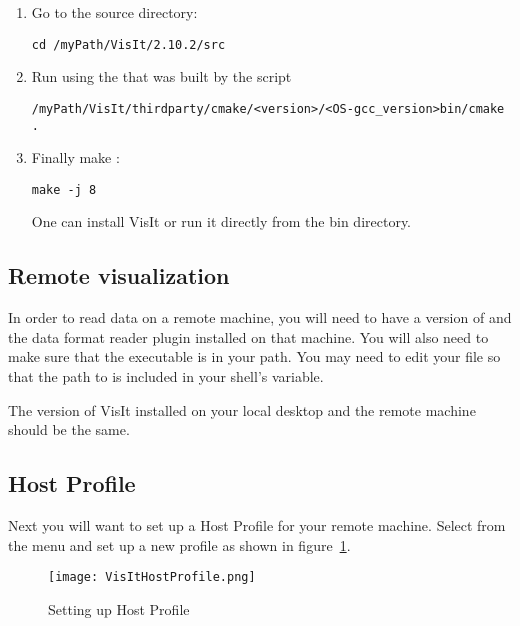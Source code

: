 \documentclass[11pt,fleqn]{book} %
\begin{document}
\begin{enumerate}
  \item Go to the \Visit source directory:
\begin{lstlisting}[backgroundcolor=\color{background}]
cd /myPath/VisIt/2.10.2/src
\end{lstlisting}

  \item Run  using the  that was built by the  script
\begin{lstlisting}[backgroundcolor=\color{background}]
/myPath/VisIt/thirdparty/cmake/<version>/<OS-gcc_version>bin/cmake .
\end{lstlisting}

  \item Finally make \Visit:
\begin{lstlisting}[backgroundcolor=\color{background}]
make -j 8
\end{lstlisting}
        One can install VisIt or run it directly from the bin directory.
\end{enumerate}


\subsection{Remote visualization}
In order to read data on a remote machine, you will need to have a
version of \Visit and the \VTK data format reader plugin installed on that
machine. You will also need to make sure that the \Visit executable is
in your path. You may need to edit your  
file so that the path to \Visit is included in your shell's  variable.

\begin{NoteBox}
The version of VisIt installed on your local desktop and the
remote machine should be the same.
\end{NoteBox}

\subsection{Host Profile}
Next you will want to set up a Host Profile for your remote
machine. Select  from the  menu and set up a
new profile as shown in figure~\ref{VisItHostProfile}.
\begin{figure}
  \centering
  \texttt{[image: VisItHostProfile.png]}
  \caption{Setting up Host Profile}
  \label{VisItHostProfile}
\end{figure}
\end{document}
